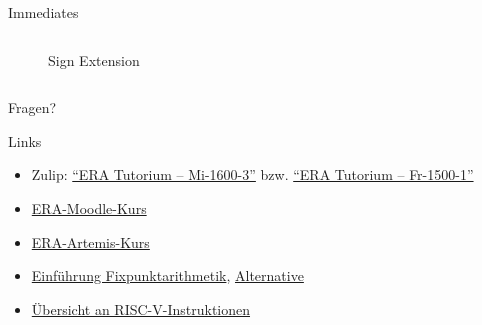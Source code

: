 \documentclass[
  german,            %
  aspectratio=169,    %
]{tumbeamer}
\begin{document}
\begin{frame}[c]{Immediates}{}
\begin{columns}[c]
\begin{column}{0.5\textwidth}
\begin{center}
\begin{figure}
					\caption{Sign Extension}
				\end{figure}
			\end{center}
		\end{column}
	\end{columns}
\end{frame}

\begin{frame}[c]{}{}
	\begin{center}
		\LARGE Fragen?
	\end{center}
\end{frame}


\begin{frame}[fragile, c]{Links}{}
	\begin{itemize}
		\item Zulip: \href{https://zulip.in.tum.de/#narrow/channel/3255-ERA-Tutorium-.E2.80.93-Mi-1600-3}{\enquote{ERA Tutorium -- Mi-1600-3}}
		      bzw. \href{https://zulip.in.tum.de/#narrow/channel/3264-ERA-Tutorium-.E2.80.93-Fr-1500-1}{\enquote{ERA Tutorium -- Fr-1500-1}}
		\item \href{https://www.moodle.tum.de/course/view.php?id=111440}{ERA-Moodle-Kurs}
		\item \href{https://artemis.in.tum.de/courses/516}{ERA-Artemis-Kurs}
		\item \href{https://vanhunteradams.com/FixedPoint/FixedPoint.html}{Einführung Fixpunktarithmetik}, \href{https://specbranch.com/posts/fixed-point/}{Alternative}
		\item \href{https://msyksphinz-self.github.io/riscv-isadoc/html/index.html}{Übersicht an RISC-V-Instruktionen}
	\end{itemize}
\end{frame}

\maketitle
\end{document}
